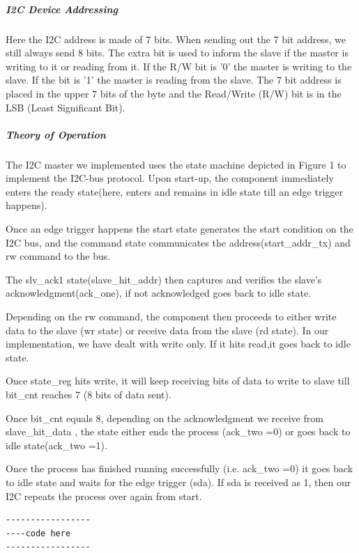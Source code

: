 \documentclass[10pt,twocolumn]{IEEEtran}
\begin{document}
\subparagraph{I2C Device Addressing}
\newline
Here the I2C address is made of 7 bits. When sending out the 7 bit address, we still always send 8 bits. The extra bit is used to inform the slave if the master is  writing to it or reading from it. If the R/W bit is '0' the master is writing to the slave. If the bit is '1' the master is reading from the slave. The 7 bit address is placed in the upper 7 bits of the byte and the Read/Write (R/W) bit is in the LSB (Least Significant Bit).

\subparagraph{Theory of Operation}
\newline
The I2C master we implemented uses the state machine depicted in Figure 1 to implement the I2C-bus protocol. Upon start-up, the component immediately enters the ready state(here, enters and remains in idle state till an edge trigger happens). 

Once an edge trigger happens the start state generates the start condition on the I2C bus, and the command state communicates the address(start\_addr\_tx) and rw command to the bus. 

The slv\_ack1 state(slave\_hit\_addr) then captures and verifies the slave’s acknowledgment(ack\_one), if not acknowledged goes back to idle state. 

Depending on the rw command, the component then proceeds to either write data to the slave (wr state) or receive data from the slave (rd state). 
In our implementation, we have dealt with write only. If it hits read,it goes back to idle state.

Once state\_reg hits write, it will keep receiving bits of data to write to slave till bit\_cnt reaches 7 (8 bits of data sent).

Once bit\_cnt equals 8, depending on the acknowledgment we receive from slave\_hit\_data , the state either ends the process (ack\_two =0) or goes back to idle state(ack\_two =1). 

Once the process has finished running successfully (i.e. ack\_two =0) it goes back to idle state and waits for the edge trigger (sda). If sda is received as 1, then our I2C repeats the process over again from start.
  
  
  
  \begin{verbatim}
-----------------
----code here
-----------------
  \end{verbatim}
\end{document}
